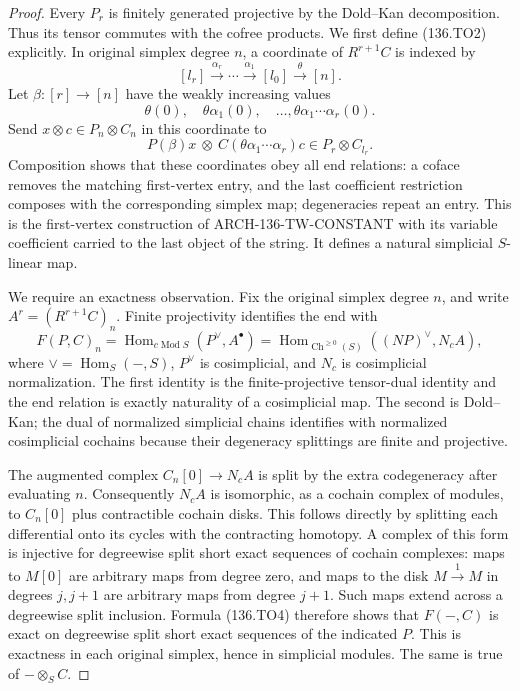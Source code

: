 \begin{proof}
Every $P_r$ is finitely generated projective by the
Dold--Kan decomposition. Thus its tensor commutes with
the cofree products. We first define (136.TO2) explicitly.
In original simplex degree $n$, a coordinate of
$R^{r+1}C$ is indexed by
\[
 [l_r]\xrightarrow{\alpha_r}\cdots
 \xrightarrow{\alpha_1}[l_0]\xrightarrow{\theta}[n].
\]
Let $\beta:[r]\to[n]$ have the weakly increasing values
\[
 \theta(0),\quad\theta\alpha_1(0),\quad\ldots,
                         \theta\alpha_1\cdots\alpha_r(0).
\]
Send $x\otimes c\in P_n\otimes C_n$ in this coordinate to
\[
           P(\beta)x\ \otimes\
                  C(\theta\alpha_1\cdots\alpha_r)c
                           \in P_r\otimes C_{l_r}.      \tag{136.TO3}
\]
Composition shows that these coordinates obey all end
relations: a coface removes the matching first-vertex
entry, and the last coefficient restriction composes
with the corresponding simplex map; degeneracies repeat
an entry. This is the first-vertex construction of
ARCH-136-TW-CONSTANT with its variable coefficient
carried to the last object of the string. It defines a
natural simplicial $S$-linear map.

We require an exactness observation. Fix the original
simplex degree $n$, and write $A^r=(R^{r+1}C)_n$.
Finite projectivity identifies the end with
\[
 F(P,C)_n=
 \operatorname{Hom}_{c\operatorname{Mod}S}(P^\vee,A^
 \bullet)
 =\operatorname{Hom}_{\operatorname{Ch}^{\geq0}(S)}
                         ((NP)^\vee,N_c A),             \tag{136.TO4}
\]
where $\vee=\operatorname{Hom}_S(-,S)$, $P^\vee$ is
cosimplicial, and $N_c$ is cosimplicial normalization.
The first identity is the finite-projective tensor-dual
identity and the end relation is exactly naturality
of a cosimplicial map. The second is Dold--Kan; the dual
of normalized simplicial chains identifies with normalized
cosimplicial cochains because their degeneracy splittings
are finite and projective.

The augmented complex $C_n[0]\to N_cA$ is split by
the extra codegeneracy after evaluating $n$. Consequently
$N_cA$ is isomorphic, as a cochain complex of modules,
to $C_n[0]$ plus contractible cochain disks. This follows
directly by splitting each differential onto its cycles
with the contracting homotopy. A complex of this form
is injective for degreewise split short exact sequences
of cochain complexes: maps to $M[0]$ are arbitrary maps
from degree zero, and maps to the disk
$M\xrightarrow{1}M$ in degrees $j,j+1$ are arbitrary
maps from degree $j+1$. Such maps extend across a
degreewise split inclusion. Formula (136.TO4) therefore
shows that $F(-,C)$ is exact on degreewise split short
exact sequences of the indicated $P$. This is exactness
in each original simplex, hence in simplicial modules.
The same is true of $-\otimes_S C$.


\end{proof}
